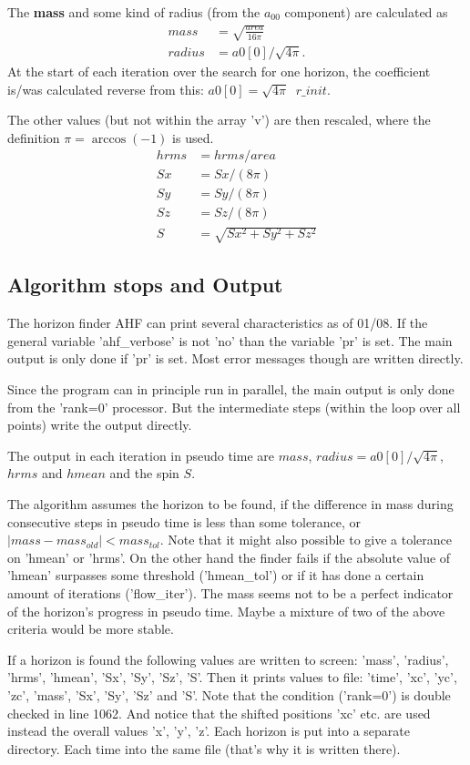 \documentclass[11pt,a4paper,twoside]{article}
\begin{document}
The \textbf{mass} and some kind of radius (from the $a_{00}$ component)
are calculated as 
\begin{align}
  mass &=  \sqrt{\frac {area}{16 \pi}} \\
  radius &= a0[0]/\sqrt{4\pi}.
\end{align}
At the start of each iteration over the search for one horizon, the coefficient
is/was calculated reverse from this: $a0[0] = \sqrt{4 \pi}\;\; r\_init$.

The other values (but not within the array 'v') are then rescaled,
where the definition $\pi=\arccos (-1)$ is used.
\begin{align}
  hrms &= hrms /area \\
  Sx &= Sx / (8 \pi ) \\
  Sy &= Sy / (8 \pi ) \\
  Sz &= Sz / (8 \pi ) \\
  S &= \sqrt{S\!x^2 + S\!y^2 +S\!z^2}
\end{align}

\subsection{Algorithm stops and Output}
The horizon finder AHF can print several characteristics as of 01/08.
If the general variable 'ahf\_verbose' is not 'no' than the variable
'pr' is set. The main output is only done if 'pr' is set. Most error
messages though are written directly.

Since the program can in principle run in parallel, the main output
is only done from the 'rank=0' processor. But the intermediate steps
(within the loop over all points) write the output directly.
 
The output in each iteration in pseudo time are
$mass$, $radius=a0[0]/\sqrt{4 \pi}$, $hrms$ and $hmean$ and the spin $S$.

The algorithm assumes the horizon to be found, if the difference in mass
during consecutive steps in pseudo time is less than some tolerance, or
$|mass - mass_{old}| < mass_{tol}$.
Note that it might also possible to give a tolerance on 'hmean' or 'hrms'.
On the other hand the finder fails if the absolute value of 'hmean' surpasses
some threshold ('hmean\_tol') or if it has done a certain amount of iterations
('flow\_iter').
\warningsymbol The mass seems not to be a perfect indicator of the horizon's
progress in pseudo time. Maybe a mixture of two of the above criteria would
be more stable.

If a horizon is found the following values are written to screen:
'mass', 'radius', 'hrms', 'hmean', 'Sx', 'Sy', 'Sz', 'S'.
Then it prints values to file:
'time', 'xc', 'yc', 'zc', 'mass', 'Sx', 'Sy', 'Sz' and 'S'.
Note that the condition ('rank=0') is double checked in line 1062.
\warningsymbol And notice that the shifted positions 'xc' etc. are used instead
the overall values 'x', 'y', 'z'.
Each horizon is put into a separate directory. Each time into the same
file (that's why it is written there).
\end{document}
